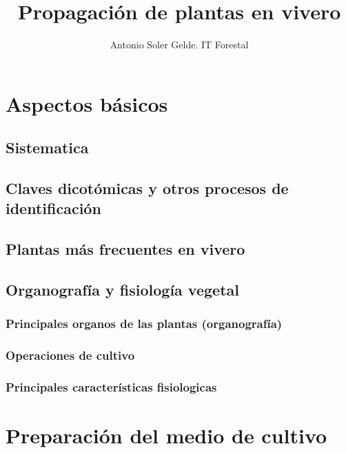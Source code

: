 \documentclass[a4paper,12pt,oneside]{article}
\author{Antonio Soler Gelde. IT Forestal}
\date{}
\title{Propagación de plantas en vivero}
\begin{document}
\maketitle
\tableofcontents


\section{Aspectos básicos}
\label{sec:orgaf7fcae}
\subsection{Sistematica}
\label{sec:org2f98878}
\subsection{Claves dicotómicas y otros procesos de identificación}
\label{sec:orgff178b2}
\subsection{Plantas más frecuentes en vivero}
\label{sec:org35e0851}
\subsection{Organografía y fisiología vegetal}
\label{sec:orge5d2e27}
\subsubsection{Principales organos de las plantas (organografía)}
\label{sec:orga7c6b58}
\subsubsection{Operaciones de cultivo}
\label{sec:orgdd7ccda}
\subsubsection{Principales características fisiologicas}
\label{sec:org0105c8e}
\section{Preparación del medio de cultivo}
\label{sec:org241d138}
\end{document}
